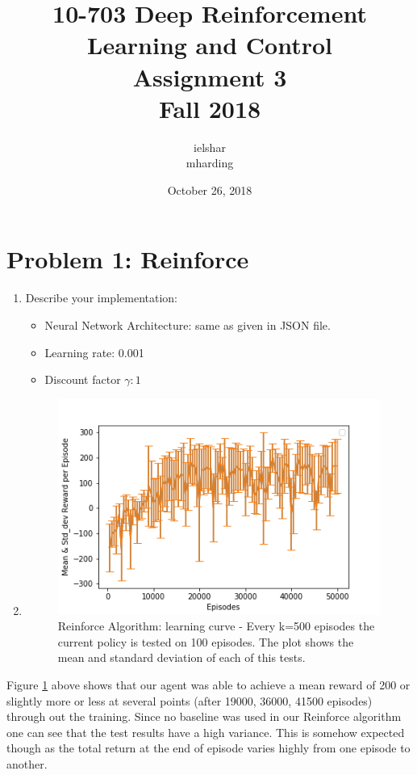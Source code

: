 \documentclass[12pt]{article}
\title{10-703 Deep Reinforcement Learning and Control\\
  Assignment 3\\
  Fall 2018 \\  
}
\author{ielshar \\ mharding}
\date{October 26, 2018}
\begin{document}
\maketitle

\section*{Problem 1: Reinforce}
\begin{enumerate}
	\item  Describe your implementation:
	\begin{itemize}
		\item Neural Network Architecture:  same as given in JSON file.
		\item Learning rate: 0.001
		\item Discount factor $\gamma: 1$
	\end{itemize}
	\item 
		\begin{figure}[H]
		\begin{center} 
			\includegraphics[scale=.73]{figures/Reinforce_LC_50.png}
		\end{center}
		\caption{Reinforce Algorithm: learning curve - Every k=500 episodes the current policy is tested on 100 episodes. The plot shows the mean and standard deviation of each of this tests.  } 	\label{1}%
	\end{figure}
\end{enumerate}

Figure \ref{1} above shows that our agent was able to achieve a mean reward of 200  or slightly more or less at several points (after 19000, 36000, 41500 episodes) through out the training. Since no baseline was used in our Reinforce algorithm one can see that the test results have a high variance. This is somehow expected though as the total return at the end of episode varies highly from one episode to another.
\end{document}
